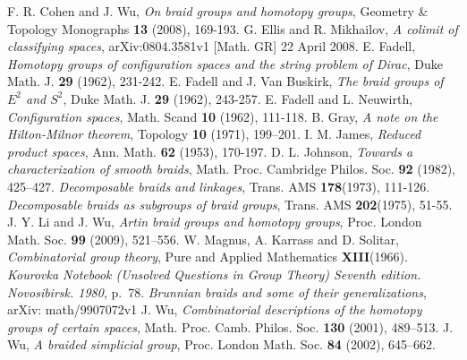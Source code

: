 \documentclass[10pt]{amsart}
\numberwithin{equation}{section}
\begin{document}
\begin{thebibliography}{MMM}
{\textrm{{F. R. Cohen and J. Wu}},}
{\textsl{{On braid groups and homotopy groups}},}
{\textrm{{Geometry \& Topology Monographs}}} {\textbf{{13}}} {\textrm{({2008})}}, {\textrm{{169-193}}}.
 {\textrm{{G. Ellis and R. Mikhailov}},} {\textsl{{A colimit of classifying spaces}},} arXiv:0804.3581v1 [Math. GR] 22 April 2008.
 {\textrm{{E. Fadell}},} {\textsl{{Homotopy groups of configuration spaces and the string problem of Dirac}},} {\textrm{{Duke Math. J.}}} {\textbf{{29}}} {\textrm{({1962})}}, {\textrm{{231-242}}}.
 {\textrm{{E. Fadell and J. Van Buskirk}},} {\textsl{{The braid groups of $E^{2}$ and $S^{2}$}},} {\textrm{{Duke Math. J.}}} {\textbf{{29}}} {\textrm{({1962})}}, {\textrm{{243-257}}}.
 {\textrm{{E. Fadell and L. Neuwirth}},} {\textsl{{Configuration spaces}},}  {\textrm{{Math. Scand}}} {\textbf{{10}}} {\textrm{({1962})}}, {\textrm{{111-118}}}.
 {\textrm{{B. Gray}},} {\textsl{{A note on the Hilton-Milnor theorem}},} {\textrm{{Topology}}} {\textbf{{10}}} {\textrm{({1971})}}, {\textrm{{199--201}}}.
 {\textrm{{I. M. James}},} {\textsl{{Reduced product spaces}},} {\textrm{{Ann. Math.}}} {\textbf{{62}}} {\textrm{({1953})}}, {\textrm{{170-197}}}.
 \textrm{D. L. Johnson}, \textsl{Towards a characterization
of smooth braids}, \textrm{Math. Proc. Cambridge Philos. Soc.}
\textbf{92} \textrm{(1982)}, \textrm{425--427}.
 {\textsl{{Decomposable braids and linkages}},} {\textrm{{Trans. AMS}}} {\textbf{{178}}}{\textrm{({1973})}}, {\textrm{{111-126}}}.
 {\textsl{{Decomposable braids as subgroups of braid groups}},} {\textrm{{Trans. AMS}}} {\textbf{{202}}}{\textrm{({1975})}}, {\textrm{{51-55}}}.
 \textrm{ J. Y. Li and J. Wu}, \textsl{Artin braid groups and homotopy groups}, \textrm{Proc. London Math. Soc.} \textbf{99} \textrm{(2009)},
\textrm{521--556}.
{\textrm{{W. Magnus, A. Karrass and D. Solitar}},}
{\textsl{{Combinatorial group theory}},}
{\textrm{{Pure and Applied Mathematics}}}
{\textbf{{XIII}}}{\textrm{({1966})}}.
 {\textsl{{Kourovka Notebook (Unsolved Questions  in Group Theory) Seventh edition. Novosibirsk. 1980}},}  \textrm{p.~78}.
 {\textsl{{Brunnian braids and some of their generalizations}},} arXiv: math/9907072v1
 \textrm{J. Wu}, \textsl{Combinatorial descriptions of the
homotopy groups of certain spaces}, \textrm{Math. Proc. Camb.
Philos. Soc.} \textbf{130} \textrm{(2001)}, \textrm{489--513}.
\textrm{J. Wu}, \textsl{A braided simplicial group},
\textrm{Proc. London Math. Soc.} \textbf{84} \textrm{(2002)},
\textrm{645--662}.
\end{thebibliography}
\end{document}
